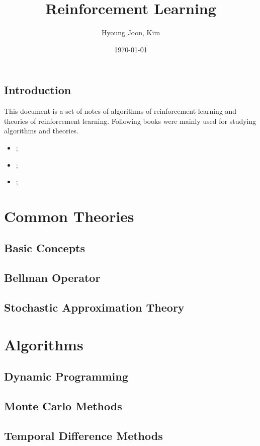 \documentclass{report}
\title{Reinforcement Learning}
\author{Hyoung Joon, Kim}
\date{\today}
\begin{document}
\maketitle
\tableofcontents
\newpage
\chapter{Introduction}
        This document is a set of notes of algorithms of reinforcement learning and theories of reinforcement learning.
        Following books were mainly used for studying algorithms and theories.
        \begin{itemize}
            \item \cite{Sutton2020};
            \item \cite{Graesser2020};
            \item \cite{Zhao2025};
        \end{itemize}
\part{Common Theories}
    \chapter{Basic Concepts}
    
    \chapter{Bellman Operator}
    
    \chapter{Stochastic Approximation Theory}\label{ch:stochasticApprox}
    
\part{Algorithms}
    \chapter{Dynamic Programming}
    
    \chapter{Monte Carlo Methods}
    
    \chapter{Temporal Difference Methods}
    
\end{document}
